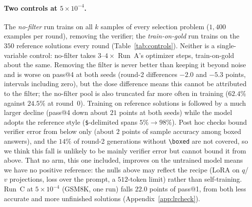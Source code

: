 \documentclass[runningheads]{llncs}
\begin{document}
\paragraph{Two controls at $5\times10^{-4}$.}
The \emph{no-filter} run trains on all $k$ samples of every selection problem
($1{,}400$ examples per round), removing the verifier; the
\emph{train-on-gold} run trains on the $350$ reference solutions every round
(Table~\ref{tab:controls}). Neither is a single-variable control: no-filter
takes $3$--$4\times$ Run~A's optimizer steps, train-on-gold about the same.
Removing the filter is never better than keeping it beyond noise and is worse on
pass@4 at both seeds (round-2 differences $-2.0$ and $-5.3$ points, intervals
including zero), but the dose difference means this cannot be attributed to the
filter; the no-filter pool is also truncated far more often in training
($62.4\%$ against $24.5\%$ at round~0). Training on reference solutions is
followed by a much larger decline (pass@4 down about $21$ points at both
seeds) while the model adopts the reference style (\texttt{\$}-delimited
spans $5\%\to98\%$). Post hoc checks bound verifier error from below only
(about $2$ points of sample accuracy among boxed answers), and the $14\%$ of
round-2 generations without \verb|\boxed| are not covered, so we think this
fall is unlikely to be mainly verifier error but cannot bound it from above.
That no arm, this one included, improves on the untrained model means we have
no positive reference: the nulls above may reflect the recipe (LoRA on
$q$/$v$ projections, loss over the prompt, a $512$-token limit) rather than
self-training. Run~C at
$5\times10^{-4}$ (GSM8K, one run) falls $22.0$ points of pass@1, from both less
accurate and more unfinished solutions (Appendix~\ref{app:lrcheck}).
\end{document}
